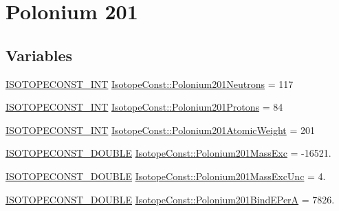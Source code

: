 \hypertarget{group___isotope_const-_polonium-_po201}{}\section{Polonium 201}
\label{group___isotope_const-_polonium-_po201}
\subsection*{Variables}
\begin{DoxyCompactItemize}
\item 
\mbox{\hyperlink{group___isotope_const-_macros_ga5f18360b3e99483a35c32d789e62621c}{I\+S\+O\+T\+O\+P\+E\+C\+O\+N\+S\+T\+\_\+\+I\+NT}} \mbox{\hyperlink{group___isotope_const-_polonium-_po201_ga2fe90664341baef8d0e8c25ad53ef2ea}{Isotope\+Const\+::\+Polonium201\+Neutrons}} = 117
\item 
\mbox{\hyperlink{group___isotope_const-_macros_ga5f18360b3e99483a35c32d789e62621c}{I\+S\+O\+T\+O\+P\+E\+C\+O\+N\+S\+T\+\_\+\+I\+NT}} \mbox{\hyperlink{group___isotope_const-_polonium-_po201_ga5cd5cc542045caea6db903ac5782fe2f}{Isotope\+Const\+::\+Polonium201\+Protons}} = 84
\item 
\mbox{\hyperlink{group___isotope_const-_macros_ga5f18360b3e99483a35c32d789e62621c}{I\+S\+O\+T\+O\+P\+E\+C\+O\+N\+S\+T\+\_\+\+I\+NT}} \mbox{\hyperlink{group___isotope_const-_polonium-_po201_gae874f593963cc2d8e901e608edff8925}{Isotope\+Const\+::\+Polonium201\+Atomic\+Weight}} = 201
\item 
\mbox{\hyperlink{group___isotope_const-_macros_ga8f45a7272ce02c0b4c65c44636ed719a}{I\+S\+O\+T\+O\+P\+E\+C\+O\+N\+S\+T\+\_\+\+D\+O\+U\+B\+LE}} \mbox{\hyperlink{group___isotope_const-_polonium-_po201_ga4d60f35ba8c46d690b120c11ad999e56}{Isotope\+Const\+::\+Polonium201\+Mass\+Exc}} = -\/16521.
\item 
\mbox{\hyperlink{group___isotope_const-_macros_ga8f45a7272ce02c0b4c65c44636ed719a}{I\+S\+O\+T\+O\+P\+E\+C\+O\+N\+S\+T\+\_\+\+D\+O\+U\+B\+LE}} \mbox{\hyperlink{group___isotope_const-_polonium-_po201_ga6d3e05d8ed2df06327eafca6587d7a28}{Isotope\+Const\+::\+Polonium201\+Mass\+Exc\+Unc}} = 4.
\item 
\mbox{\hyperlink{group___isotope_const-_macros_ga8f45a7272ce02c0b4c65c44636ed719a}{I\+S\+O\+T\+O\+P\+E\+C\+O\+N\+S\+T\+\_\+\+D\+O\+U\+B\+LE}} \mbox{\hyperlink{group___isotope_const-_polonium-_po201_gaced4d0ada12d7df48b78e4b19f1b5d33}{Isotope\+Const\+::\+Polonium201\+Bind\+E\+PerA}} = 7826.
\item 

\end{DoxyCompactItemize}
